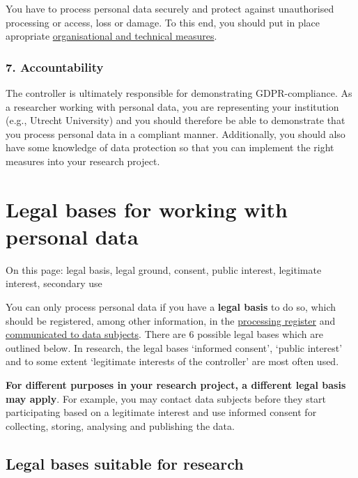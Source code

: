 \documentclass[
]{book}
\begin{document}
You have to process personal data securely and protect against unauthorised
processing or access, loss or damage. To this end, you should put in place
apropriate \protect\hyperlink{privacy-by-design}{organisational and technical measures}.

\hypertarget{accountability}{%
\subsubsection{7. Accountability}\label{accountability}}

The controller is ultimately responsible for demonstrating GDPR-compliance. As a
researcher working with personal data, you are representing your institution
(e.g., Utrecht University) and you should therefore be able to demonstrate that
you process personal data in a compliant manner. Additionally, you should also
have some knowledge of data protection so that you can implement the right
measures into your research project.

\hypertarget{legal-basis}{%
\section{Legal bases for working with personal data}\label{legal-basis}}

On this page: legal basis, legal ground, consent, public interest, legitimate
interest, secondary use

You can only process personal data if you have a \textbf{legal basis} to do so, which
should be registered, among other information, in the
\protect\hyperlink{processing-register}{processing register} and
\protect\hyperlink{privacy-notices}{communicated to data subjects}. There are 6 possible
legal bases which are outlined below. In research, the legal bases `informed
consent', `public interest' and to some extent `legitimate interests of the
controller' are most often used.

\textbf{For different purposes in your research project, a different
legal basis may apply}. For example, you may contact data subjects before they
start participating based on a legitimate interest and use informed consent for
collecting, storing, analysing and publishing the data.

\hypertarget{legal-bases-suitable-for-research}{%
\subsection{Legal bases suitable for research}\label{legal-bases-suitable-for-research}}
\end{document}
